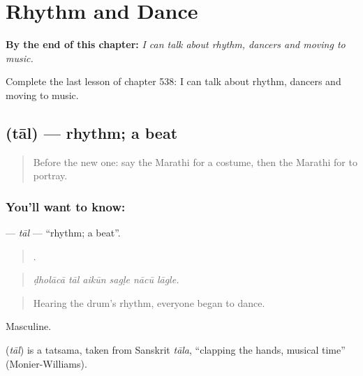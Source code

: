 
\chapter{Rhythm and Dance}
\label{ch:mr-rhythm-and-dance}

\begin{chapteropening}
\textbf{By the end of this chapter:} \emph{I can talk about rhythm, dancers and moving to music.}

Complete the last lesson of chapter 538: I can talk about rhythm, dancers and moving to music.
\end{chapteropening}

\section[\texorpdfstring{\mr{ताल} (tāl)}{ताल (tāl)}]{ (tāl) — rhythm; a beat}

\label{lesson:MR-C538-tal}



\begin{quote}
Before the new one: say the Marathi for a costume, then the Marathi for to portray.
\end{quote}

\subsection*{You'll want to know: }
\textbf{} — \emph{tāl} — \textquotedblleft{}rhythm; a beat\textquotedblright{}.

\begin{quote}
     .
\end{quote}

\begin{quote}
\emph{ḍholācā tāl aikūn sagḷe nācū lāgle.}
\end{quote}

\begin{quote}
Hearing the drum's rhythm, everyone began to dance.
\end{quote}

Masculine.

\begin{cousinweb}
\textbf{} (\emph{tāl}) is a tatsama, taken from Sanskrit \emph{tāla}, \textquotedblleft{}clapping the hands, musical time\textquotedblright{} (Monier-Williams).
\end{cousinweb}

